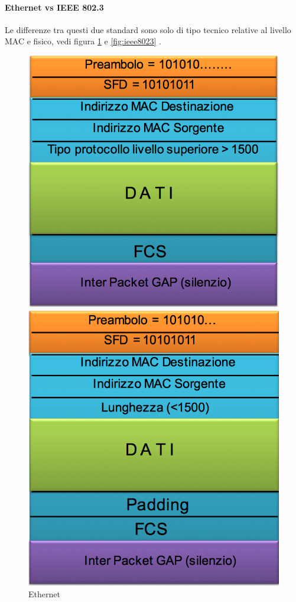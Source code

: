 \documentclass[12pt]{article}
\begin{document}
\paragraph{Ethernet vs IEEE 802.3}
Le differenze tra questi due standard sono solo di tipo tecnico relative al livello MAC e fisico, vedi figura \ref{fig:eth} e \ref{fig:ieee8023} .
\begin{figure}[!hbpt]
  \centering
  \begin{minipage}{.45\textwidth}
    \centering
    \includegraphics[width=\linewidth]{images/eth.png}
    \caption{Ethernet}
    \label{fig:eth}
  \end{minipage}\hfill
  \begin{minipage}{.45\textwidth}
    \centering
    \includegraphics[width=\linewidth]{images/ieee8023.png}

\end{minipage}
\end{figure}
\end{document}
